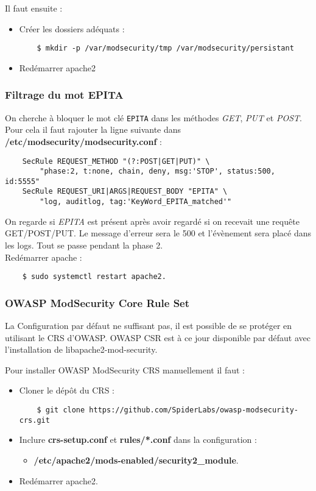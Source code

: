 Il faut ensuite :
\begin{itemize}
    \item Créer les dossiers adéquats :
\begin{verbatim}
    $ mkdir -p /var/modsecurity/tmp /var/modsecurity/persistant
\end{verbatim}
    \item Redémarrer apache2
\end{itemize}

\subsubsection{Filtrage du mot \textbf{EPITA}}
    On cherche à bloquer le mot clé \texttt{EPITA} dans les méthodes \textit{GET}, \textit{PUT} et \textit{POST}. Pour cela il faut rajouter la ligne suivante dans \textbf{/etc/modsecurity/modsecurity.conf} :
    \begin{verbatim}
    SecRule REQUEST_METHOD "(?:POST|GET|PUT)" \ 
        "phase:2, t:none, chain, deny, msg:'STOP', status:500, id:5555"
    SecRule REQUEST_URI|ARGS|REQUEST_BODY "EPITA" \ 
        "log, auditlog, tag:'KeyWord_EPITA_matched'"
    \end{verbatim}
    On regarde si \textit{EPITA} est présent après avoir regardé si on recevait une requête GET/POST/PUT. Le message d'erreur sera le 500 et l'évènement sera placé dans les logs. Tout se passe pendant la phase 2.\\ 
    
    Redémarrer apache :
    \begin{verbatim}
    $ sudo systemctl restart apache2.
    \end{verbatim}
    
\subsubsection{OWASP ModSecurity Core Rule Set}

La Configuration par défaut ne suffisant pas, il est possible de se protéger en utilisant le CRS d'OWASP.
OWASP CSR est à ce jour disponible par défaut avec l'installation de libapache2-mod-security.

Pour installer OWASP ModSecurity CRS manuellement il faut : 
\begin{itemize}
    \item Cloner le dépôt du CRS :
    \begin{verbatim}
    $ git clone https://github.com/SpiderLabs/owasp-modsecurity-crs.git
    \end{verbatim}
    \item Inclure \textbf{crs-setup.conf} et \textbf{rules/*.conf} dans la configuration : 
    \begin{itemize}
        \item \textbf{/etc/apache2/mods-enabled/security2\_module}.
    \end{itemize}
    \item Redémarrer apache2.
\end{itemize}